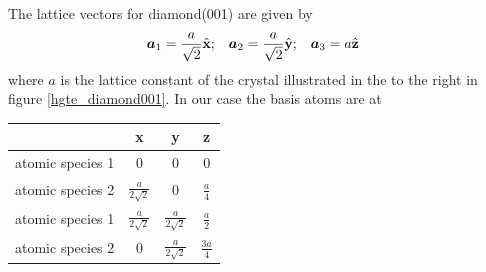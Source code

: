 	The lattice vectors for diamond(001) are given by
	\begin{align} \label{001_basis}
		\boldsymbol{a}_1&=\frac{a}{\sqrt{2}} \hat{\textbf{x}}; &
		\boldsymbol{a}_2&=\frac{a}{\sqrt{2}} \hat{\textbf{y}}; &
		\boldsymbol{a}_3&=a \hat{\textbf{z}}
	\end{align}
	where $a$ is the lattice constant of the crystal \cite{Graz} illustrated in the to the right in figure \ref{hgte_diamond001}. 
	In our case the basis atoms are at
	\\
	\begin{center}
		\begin{tabular}{c c c c} 
			\hline
			& \textbf{x} & \textbf{y} & \textbf{z}\\ 
			\hline 
			\vspace{0.2cm} 
			atomic species 1 & 0 & 0 & 0 \\
			\vspace{0.2cm}
			atomic species 2 & $\frac{a}{2\sqrt{2}}$ & 0 & $\frac{a}{4}$ \\
			\vspace{0.2cm}
			atomic species 1 & $\frac{a}{2\sqrt{2}}$ & $\frac{a}{2\sqrt{2}}$ & $\frac{a}{2}$ \\
			\vspace{0.2cm}
			atomic species 2 & 0 & $\frac{a}{2\sqrt{2}}$ & $\frac{3a}{4}$
		\end{tabular}
	\end{center}	
	\FloatBarrier
